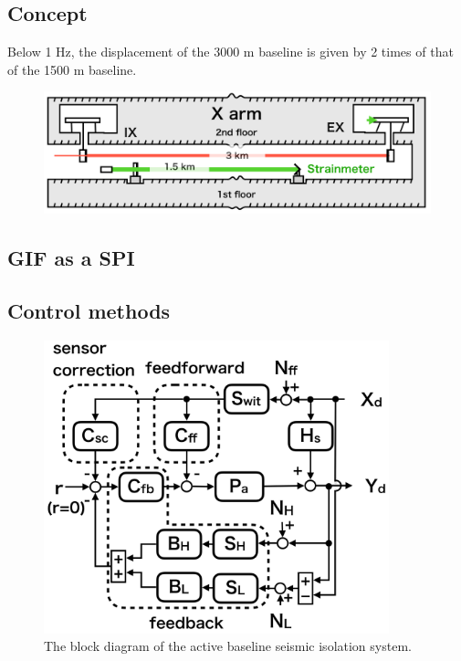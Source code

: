 \subsection{Concept}


Below 1 Hz, the displacement of the 3000 m baseline is given by 2 times of that of the 1500 m baseline.

\begin{figure}[h]
  \begin{center}   
    \includegraphics[width=14cm]{./img_chap5/img512.png}
    \caption{} \label{img:img512}
  \end{center}
\end{figure}



\subsection{GIF as a SPI}


\subsection{Control methods}
\begin{figure}[h]
  \begin{center}   
    \includegraphics[width=10cm]{./img_chap5/img511.png}
    \caption{The block diagram of the active baseline seismic isolation system.} \label{img:img511}
  \end{center}
\end{figure}

